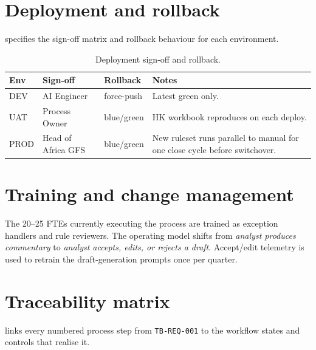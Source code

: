 \documentclass[11pt,a4paper,twoside]{report}
\begin{document}
\section{Deployment and rollback}

 specifies the sign-off matrix and rollback
behaviour for each environment.

\begin{table}[htbp]
\caption{Deployment sign-off and rollback.}\label{tab:deployment}
\centering
\footnotesize
\begin{tabularx}{\linewidth}{@{}lllX@{}}
\toprule
\textbf{Env} & \textbf{Sign-off} & \textbf{Rollback} & \textbf{Notes} \\ \midrule
DEV  & AI Engineer        & force-push   & Latest green only. \\
UAT  & Process Owner      & blue/green   & HK workbook reproduces on each deploy. \\
PROD & Head of Africa GFS & blue/green   & New ruleset runs parallel to manual for one close cycle before switchover. \\
\bottomrule
\end{tabularx}
\end{table}

\section{Training and change management}

The 20--25 FTEs currently executing the process are trained as
exception handlers and rule reviewers. The operating model shifts
from \emph{analyst produces commentary} to \emph{analyst accepts,
edits, or rejects a draft}. Accept/edit telemetry is used to retrain
the draft-generation prompts once per quarter.

\section{Traceability matrix}

 links every numbered process step from
\texttt{TB-REQ-001} to the workflow states and controls that realise
it.
\end{document}
